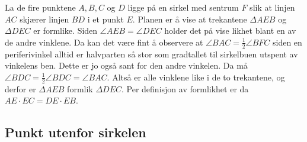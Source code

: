 \documentclass[norsk,twoside,utf8]{article}
\begin{document}
\begin{multicols}{2}

\begin{center}
\end{center}
\vspace{1cm}

\noindent
La de fire punktene $A,B,C$ og $D$ ligge på en sirkel med sentrum $F$ slik at linjen $AC$ skjærer linjen $BD$ i et punkt $E$. Planen er å vise at trekantene $\Delta AEB$ og $\Delta DEC$ er formlike. Siden $\angle AEB = \angle DEC$ holder det på vise likhet blant en av de andre vinklene. Da kan det være fint å observere at $\angle BAC = \frac{1}{2}\angle BFC$ siden en periferivinkel alltid er halvparten så stor som gradtallet til sirkelbuen utspent av vinkelens ben. Dette er jo også sant for den andre vinkelen. Da må $\angle BDC = \frac{1}{2} \angle BDC = \angle BAC$. Altså er alle vinklene like i de to trekantene, og derfor er $\Delta AEB$ formlik $\Delta DEC$. Per definisjon av formlikhet er da $AE\cdot EC = DE \cdot EB$.

\end{multicols}

\subsection{Punkt utenfor sirkelen}
\end{document}
